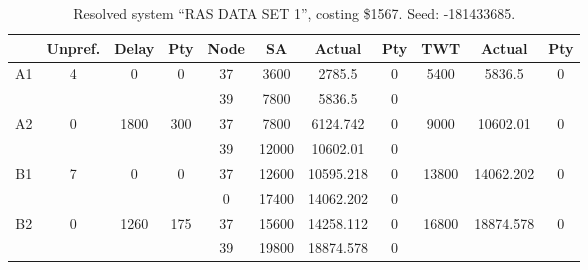 \begin{sidewaystable}
\footnotesize
\caption{Resolved system ``RAS DATA SET 1'', costing \$1567. Seed: -181433685.}
\centering
\begin{tabular}{c||c|c|c||c|c|c|c||c|c|c}
  \hline \hline
  &
  Unpref. & 
  Delay &
  Pty &
  Node &
  SA &
  Actual &
  Pty &
  TWT &
  Actual &
  Pty \\
      \hline
      \multirow{2}{*}{A1} &
      \multirow{2}{*}{4} &
      \multirow{2}{*}{0} &
      \multirow{2}{*}{0} &
      37 &
      3600 &
        2785.5 &
        0 &
      \multirow{2}{*}{5400} &
        \multirow{2}{*}{5836.5} &
        \multirow{2}{*}{0}
      \\
      \cline{5-8}
       &
       &
       &
       &
      39 &
      7800 &
        5836.5 &
        0 &
      
         &
        
      \\
      \hline
      \multirow{2}{*}{A2} &
      \multirow{2}{*}{0} &
      \multirow{2}{*}{1800} &
      \multirow{2}{*}{300} &
      37 &
      7800 &
        6124.742 &
        0 &
      \multirow{2}{*}{9000} &
        \multirow{2}{*}{10602.01} &
        \multirow{2}{*}{0}
      \\
      \cline{5-8}
       &
       &
       &
       &
      39 &
      12000 &
        10602.01 &
        0 &
      
         &
        
      \\
      \hline
      \multirow{2}{*}{B1} &
      \multirow{2}{*}{7} &
      \multirow{2}{*}{0} &
      \multirow{2}{*}{0} &
      37 &
      12600 &
        10595.218 &
        0 &
      \multirow{2}{*}{13800} &
        \multirow{2}{*}{14062.202} &
        \multirow{2}{*}{0}
      \\
      \cline{5-8}
       &
       &
       &
       &
      0 &
      17400 &
        14062.202 &
        0 &
      
         &
        
      \\
      \hline
      \multirow{2}{*}{B2} &
      \multirow{2}{*}{0} &
      \multirow{2}{*}{1260} &
      \multirow{2}{*}{175} &
      37 &
      15600 &
        14258.112 &
        0 &
      \multirow{2}{*}{16800} &
        \multirow{2}{*}{18874.578} &
        \multirow{2}{*}{0}
      \\
      \cline{5-8}
       &
       &
       &
       &
      39 &
      19800 &
        18874.578 &
        0 &
      

\end{tabular}
\end{sidewaystable}
